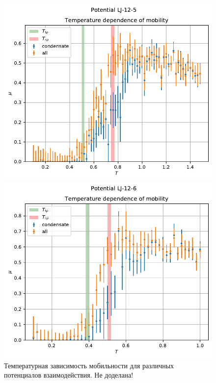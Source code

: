 \documentclass[pdf,hyperref={unicode}]{beamer}
\begin{document}
\begin{frame}
\begin{figure}[h]
\begin{center}
\begin{minipage}[h]{0.35\linewidth}
\end{minipage}
\begin{minipage}[h]{0.35\linewidth}
\includegraphics[width=\textwidth, keepaspectratio]{plot_mobility_Potential LJ-12-5_1}
\end{minipage}
\begin{minipage}[h]{0.35\linewidth}
\includegraphics[width=\textwidth, keepaspectratio]{plot_mobility_Potential LJ-12-6_1}
\end{minipage}
\caption{\tiny Температурная зависимость мобильности для различных потенциалов взаимодействия. Не доделана!}
\label{risMuDiff}
\end{center}
\end{figure}

\end{frame}
\end{document}
